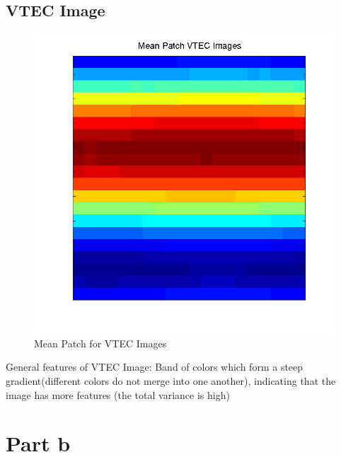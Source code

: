 \documentclass[12pt,english]{article}
\begin{document}
\subsection{VTEC Image}
\begin{figure}
    \includegraphics[width=\linewidth]{Mean-Patch-VTEC-Images}
    \caption{Mean Patch for VTEC Images}
\end{figure}

General features of VTEC Image: Band of colors which form a steep gradient(different colors do not merge into one another), indicating
that the image has more features (the total variance is high)

\pagebreak
\newpage
\clearpage

\section{Part b}
\end{document}
